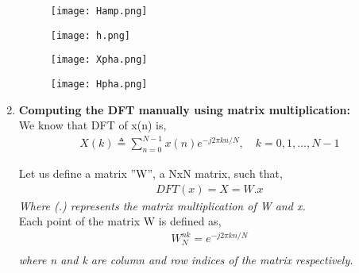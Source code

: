\documentclass[journal,12pt,twocolumn]{IEEEtran}
\renewcommand\thesection{\arabic{section}}
\begin{document}
\begin{enumerate}[label=\thesection.\arabic*.,ref=\thesection.\theenumi]
\begin{figure}[h!]
    \centering
    \texttt{[image: Hamp.png]}
    \label{figs}
\end{figure}

\begin{figure}[h!]
    \centering
    \texttt{[image: h.png]}
    \label{figs}
\end{figure}
\vspace{1cm}
\begin{figure}[h!]
    \centering
    \texttt{[image: Xpha.png]}
    \label{figs}
\end{figure}

\begin{figure}[h!]
    \centering
    \texttt{[image: Hpha.png]}
    \label{figs}
\end{figure}


\newpage
\item
{ \bf Computing the DFT manually using matrix multiplication:} \\

We know that DFT of x(n) is, \\
\begin{align}
    X(k) \triangleq \sum_{n=0}^{N-1}x(n)e^{-j2\pi kn/N},\quad k=0,1, \ldots, N-1 
\end{align}

Let us define a matrix ''W'', a NxN matrix, such that, 
\begin{align}
    DFT(x)= X = W.x  \label{eq:dftx}
\end{align}
\emph {Where (.) represents the matrix multiplication of W and x.} \\
Each point of the matrix W is defined as, \\
\begin{align}
    W_N^{nk}=e^{-j2\pi kn/N} \\
\end{align}
\emph{where n and k are column and row indices of the matrix respectively.} \\


\end{enumerate}
\end{document}
